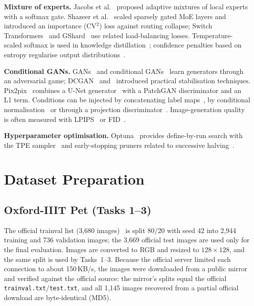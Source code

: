 \documentclass[conference]{IEEEtran}
\begin{document}
\textbf{Mixture of experts.} Jacobs et al.~\cite{jacobs1991moe} proposed adaptive mixtures of local experts
with a softmax gate. Shazeer et al.~\cite{shazeer2017moe} scaled sparsely gated MoE layers and introduced an
importance (CV$^2$) loss against routing collapse; Switch Transformers~\cite{fedus2022switch} and
GShard~\cite{lepikhin2021gshard} use related load-balancing losses. Temperature-scaled softmax is used in
knowledge distillation~\cite{hinton2015distill}; confidence penalties based on entropy
regularise output distributions~\cite{pereyra2017confidence}.

\textbf{Conditional GANs.} GANs~\cite{goodfellow2014gan} and conditional GANs~\cite{mirza2014cgan} learn
generators through an adversarial game; DCGAN~\cite{radford2016dcgan} and~\cite{salimans2016improved}
introduced practical stabilisation techniques. Pix2pix~\cite{isola2017pix2pix} combines a U-Net
generator~\cite{ronneberger2015unet} with a PatchGAN discriminator and an L1 term. Conditions can be
injected by concatenating label maps~\cite{choi2018stargan}, by conditional normalisation~\cite{devries2017cbn,perez2018film}
or through a projection discriminator~\cite{miyato2018projection}. Image-generation quality is often
measured with LPIPS~\cite{zhang2018lpips} or FID~\cite{heusel2017fid}.

\textbf{Hyperparameter optimisation.} Optuna~\cite{akiba2019optuna} provides define-by-run search with the
TPE sampler~\cite{bergstra2011tpe} and early-stopping pruners related to successive
halving~\cite{jamieson2016sh,li2018hyperband}.

\FloatBarrier
\section{Dataset Preparation}
\subsection{Oxford-IIIT Pet (Tasks 1--3)}
The official trainval list (3,680 images)~\cite{parkhi2012pets} is split 80/20 with seed 42 into 2,944
training and 736 validation images; the 3,669 official test images are used only for the final evaluation.
Images are converted to RGB and resized to $128\times128$, and the same split is used by Tasks~1--3. Because
the official server limited each connection to about 150\,KB/s, the images were downloaded from a public
mirror and verified against the official source: the mirror's splits equal the official
\texttt{trainval.txt}/\texttt{test.txt}, and all 1,145 images recovered from a partial official download are
byte-identical (MD5).
\end{document}

